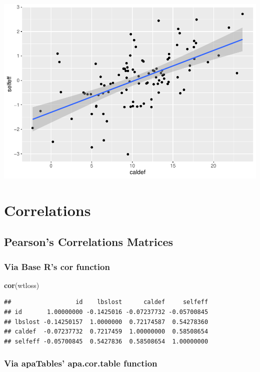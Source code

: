 \documentclass[]{article}
\newenvironment{Shaded}{\begin{snugshade}}{\end{snugshade}}
\newcommand{\KeywordTok}[1]{\textcolor[rgb]{0.13,0.29,0.53}{\textbf{#1}}}
\newcommand{\NormalTok}[1]{#1}
\begin{document}
\includegraphics{wtloss_notebook_files/figure-latex/unnamed-chunk-9-3.pdf}

\section{Correlations}\label{correlations}

\subsection{Pearson's Correlations
Matrices}\label{pearsons-correlations-matrices}

\subsubsection{Via Base R's cor
function}\label{via-base-rs-cor-function}

\begin{Shaded}
\begin{Highlighting}[]
\KeywordTok{cor}\NormalTok{(wtloss)}
\end{Highlighting}
\end{Shaded}

\begin{verbatim}
##                  id    lbslost      caldef     selfeff
## id       1.00000000 -0.1425016 -0.07237732 -0.05700845
## lbslost -0.14250157  1.0000000  0.72174587  0.54278360
## caldef  -0.07237732  0.7217459  1.00000000  0.58508654
## selfeff -0.05700845  0.5427836  0.58508654  1.00000000
\end{verbatim}

\subsubsection{Via apaTables' apa.cor.table
function}\label{via-apatables-apa.cor.table-function}
\end{document}
